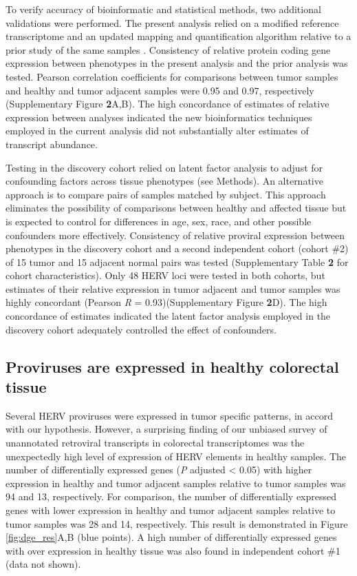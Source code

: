 To verify accuracy of bioinformatic and statistical methods, two additional validations were performed.
The present analysis relied on a modified reference transcriptome and an updated mapping and quantification algorithm relative to a prior study of the same samples \citep{Dampier2020}.
Consistency of relative protein coding gene expression between phenotypes in the present analysis and the prior analysis was tested.
Pearson correlation coefficients for comparisons between tumor samples and healthy and tumor adjacent samples were 0.95 and 0.97, respectively (Supplementary Figure \textbf{2}A,B).
The high concordance of estimates of relative expression between analyses indicated the new bioinformatics techniques employed in the current analysis did not substantially alter estimates of transcript abundance.

Testing in the discovery cohort relied on latent factor analysis to adjust for confounding factors across tissue phenotypes (see Methods).
An alternative approach is to compare pairs of samples matched by subject.
This approach eliminates the possibility of comparisons between healthy and affected tissue but is expected to control for differences in age, sex, race, and other possible confounders more effectively.
Consistency of relative proviral expression between phenotypes in the discovery cohort and a second independent cohort (cohort \#2) of 15 tumor and 15 adjacent normal pairs was tested (Supplementary Table \textbf{2} for cohort characteristics).
Only 48 HERV loci were tested in both cohorts, but estimates of their relative expression in tumor adjacent and tumor samples was highly concordant (Pearson \emph{R} = 0.93)(Supplementary Figure \textbf{2}D).
The high concordance of estimates indicated the latent factor analysis employed in the discovery cohort adequately controlled the effect of confounders.


\subsection*{Proviruses are expressed in healthy colorectal tissue}
Several HERV proviruses were expressed in tumor specific patterns, in accord with our hypothesis.
However, a surprising finding of our unbiased survey of unannotated retroviral transcripts in colorectal transcriptomes was the unexpectedly high level of expression of HERV elements in healthy samples.
The number of differentially expressed genes (\emph{P} adjusted < 0.05) with higher expression in healthy and tumor adjacent samples relative to tumor samples was 94 and 13, respectively.
For comparison, the number of differentially expressed genes with lower expression in healthy and tumor adjacent samples relative to tumor samples was 28 and 14, respectively.
This result is demonstrated in Figure \ref{fig:dge_res}A,B (blue points).
A high number of differentially expressed genes with over expression in healthy tissue was also found in independent cohort \#1 (data not shown).


